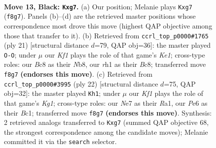 \documentclass[11pt]{article}
\begin{document}
\clearpage

\begin{figure}[p]\centering
\begin{subfigure}{0.46\textwidth}\centering
\resizebox{\linewidth}{!}{%
\newchessgame
\chessboard[
  setfen={rnb1rk2/pp1qnpPp/4p3/2PpP3/5PP1/P1P5/2P5/R1BQKBNR b KQ - 0 13},
  showmover=false,
  pgfstyle=straightmove, color=movearrow, markmove={f8-g7}
]}
\caption{}
\end{subfigure}\hfill
\begin{subfigure}{0.46\textwidth}\centering
\resizebox{\linewidth}{!}{%
\newchessgame
\chessboard[
  setfen={rnbqk2r/pp3ppp/1n2p3/3pP3/1PP2P2/P1N5/6PP/R1BQKBR1 b Qkq - 0 11},
  showmover=false,
  pgfstyle=straightmove, color=movearrow, markmove={e8-g8}
]}
\caption{}
\end{subfigure}
\\[4pt]
\begin{subfigure}{0.46\textwidth}\centering
\resizebox{\linewidth}{!}{%
\newchessgame
\chessboard[
  setfen={r2qkb1r/p4ppp/2p1bn2/8/2p5/2NP1N2/PPP3PP/R1BQ1RK1 w kq - 0 12},
  showmover=false,
  pgfstyle=straightmove, color=movearrow, markmove={g1-h1}
]}
\caption{}
\end{subfigure}\hfill

\caption{\textbf{Move 13, Black: \texttt{Kxg7}.} (a) Our position; Melanie plays \texttt{Kxg7} (\texttt{f8g7}). Panels (b)--(d) are the retrieved master positions whose correspondence most drove this move (highest QAP objective among those that transfer to it). (b) Retrieved from \texttt{ccrl\_top\_p0000\#1765} (ply 21) [structural distance $d$=79, QAP obj=36]: the master played \texttt{O-O}; under $\mu$ our \emph{Kf1} plays the role of that game's \emph{Ke1}; cross-type roles: our \emph{B}c8 as their \emph{N}b8, our \emph{r}h1 as their \emph{B}c8; transferred move \texttt{f8g7} \textbf{(endorses this move)}. (c) Retrieved from \texttt{ccrl\_top\_p0000\#3995} (ply 22) [structural distance $d$=75, QAP obj=32]: the master played \texttt{Kh1}; under $\mu$ our \emph{Kf1} plays the role of that game's \emph{Kg1}; cross-type roles: our \emph{N}e7 as their \emph{R}a1, our \emph{P}e6 as their \emph{B}c1; transferred move \texttt{f8g7} \textbf{(endorses this move)}. Synthesis: 2 retrieved analogs transferred to \texttt{Kxg7} (summed QAP objective 68, the strongest correspondence among the candidate moves); Melanie committed it via the \texttt{search} selector.}
\label{fig:thought-m25}
\end{figure}

\clearpage
\end{document}
